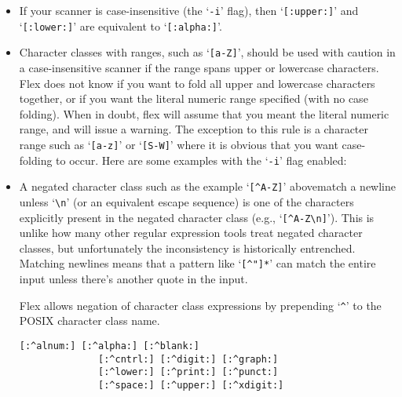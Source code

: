 \documentclass[openany,oneside]{book}
\begin{document}
\begin{itemize}
\item If your scanner is case-insensitive (the ‘\verb`-i`’ flag), then
‘\verb`[:upper:]`’ and ‘\verb`[:lower:]`’ are equivalent to
‘\verb`[:alpha:]`’.

\item Character classes with ranges, such as ‘\verb`[a-Z]`’, should be used with
caution in a case-insensitive scanner if the range spans upper or lowercase
characters. Flex does not know if you want to fold all upper and lowercase
characters together, or if you want the literal numeric range specified (with
no case folding). When in doubt, flex will assume that you meant the literal
numeric range, and will issue a warning. The exception to this rule is a
character range such as ‘\verb`[a-z]`’ or ‘\verb`[S-W]`’ where it is obvious that you
want case-folding to occur. Here are some examples with the ‘\verb`-i`’ flag
enabled:



\item A negated character class such as the example ‘\verb`[^A-Z]`’ abovematch a newline unless ‘\verb`\n`’ (or an equivalent escape
sequence) is one of the characters explicitly present in the negated
character class (e.g., ‘\verb`[^A-Z\n]`’).  This is unlike how many other
regular expression tools treat negated character classes, but
unfortunately the inconsistency is historically entrenched.  Matching
newlines means that a pattern like ‘\verb`[^"]*`’ can match the entire
input unless there's another quote in the input.


Flex allows negation of character class expressions by prepending ‘\verb`^`’ to
the POSIX character class name.
\begin{verbatim}
[:^alnum:] [:^alpha:] [:^blank:]
              [:^cntrl:] [:^digit:] [:^graph:]
              [:^lower:] [:^print:] [:^punct:]
              [:^space:] [:^upper:] [:^xdigit:]
\end{verbatim}



\end{itemize}
\end{document}
